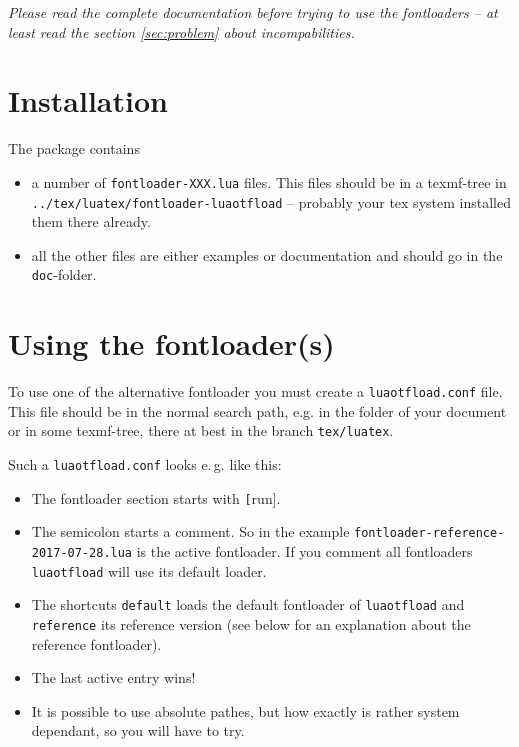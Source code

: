 \documentclass[parskip=half-,egregdoesnotlikesansseriftitles]{scrartcl}
\newcommand\package[1]{\texttt{#1}}
\begin{document}
\emph{Please read the complete documentation before trying to use the fontloaders -- at least read the section \ref{sec:problem} about incompabilities.}


\section{Installation}

The package contains

\begin{itemize}
\item a number of \texttt{fontloader-XXX.lua} files. This files should be in a texmf-tree in  \texttt{../tex/luatex/fontloader-luaotfload} -- probably your tex system installed them there already.

\item all the other files are either examples or documentation and should go in the \texttt{doc}-folder.
\end{itemize}

\section{Using the fontloader(s)}

To use one of the alternative fontloader you must create a \texttt{luaotfload.conf} file.  This file should be in the normal search path, e.g. in the folder of your document or in some texmf-tree, there at best in  the branch \texttt{tex/luatex}.

Such a \texttt{luaotfload.conf} looks e.\,g. like this:



\begin{itemize}
\item The fontloader section starts with \texttt[run].
\item The semicolon starts a comment. So in the example \texttt{fontloader-reference-2017-07-28.lua} is the active fontloader. If you comment all fontloaders \package{luaotfload} will use its default loader.
\item The shortcuts \texttt{default} loads the default fontloader of \package{luaotfload} and \texttt{reference} its reference version (see below for an explanation about the reference fontloader).
\item The last active entry wins!
\item It is possible to use absolute pathes, but how exactly is rather system dependant, so you will have to try.
\end{itemize}
\end{document}
